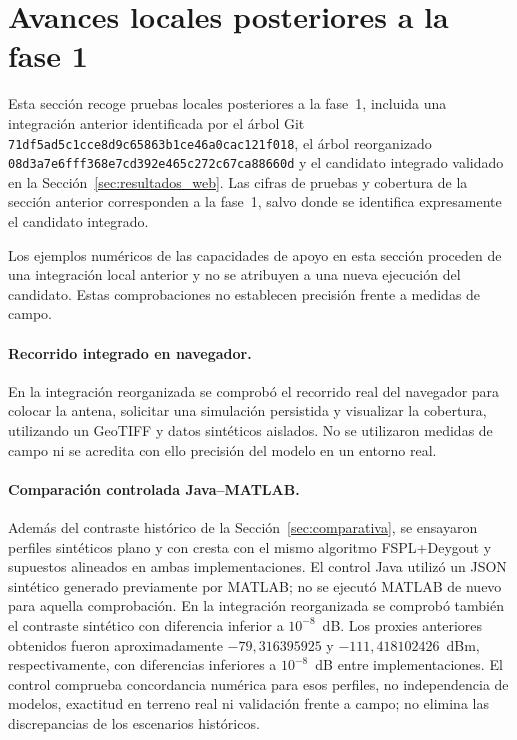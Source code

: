 \section{Avances locales posteriores a la fase 1}
\label{sec:avances_posteriores}

Esta sección recoge pruebas locales posteriores a la fase~1, incluida una integración
anterior identificada por el árbol Git \texttt{71df5ad5c1cce8d9c65863b1ce46a0cac121f018},
el árbol reorganizado \texttt{08d3a7e6fff368e7cd392e465c272c67ca88660d} y el
candidato integrado validado en la Sección~\ref{sec:resultados_web}.
Las cifras de pruebas y cobertura de la sección anterior corresponden a la fase~1,
salvo donde se identifica expresamente el candidato integrado.

Los ejemplos numéricos de las capacidades de apoyo en esta sección proceden de una
integración local anterior y no se atribuyen a una nueva ejecución del candidato.
Estas comprobaciones no establecen precisión frente a medidas de campo.

\paragraph{Recorrido integrado en navegador.}
En la integración reorganizada se comprobó el recorrido real del navegador para
colocar la antena, solicitar una simulación persistida y visualizar la cobertura,
utilizando un GeoTIFF y datos sintéticos aislados. No se utilizaron medidas de
campo ni se acredita con ello precisión del modelo en un entorno real.

\paragraph{Comparación controlada Java--MATLAB.}
Además del contraste histórico de la Sección~\ref{sec:comparativa}, se ensayaron perfiles
sintéticos plano y con cresta con el mismo algoritmo FSPL+Deygout y supuestos alineados
en ambas implementaciones. El control Java utilizó un JSON sintético generado previamente
por MATLAB; no se ejecutó MATLAB de nuevo para aquella comprobación. En la integración
reorganizada se comprobó también el contraste sintético con diferencia inferior a
$10^{-8}$~dB. Los proxies anteriores obtenidos fueron aproximadamente
$-79{,}316395925$ y $-111{,}418102426$~dBm, respectivamente, con diferencias inferiores
a $10^{-8}$~dB entre implementaciones. El control comprueba concordancia numérica para
esos perfiles, no independencia de modelos, exactitud en terreno real ni validación
frente a campo; no elimina las discrepancias de los escenarios históricos.

